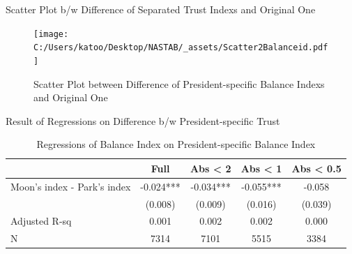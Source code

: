 \documentclass[
  ignorenonframetext,
]{beamer}
\begin{document}
\begin{frame}{Scatter Plot b/w Difference of Separated Trust Indexs and Original One}
\protect\hypertarget{scatter-plot-bw-difference-of-separated-trust-indexs-and-original-one-1}{}
\begin{figure}
\centering
\texttt{[image: C:/Users/katoo/Desktop/NASTAB/\_assets/Scatter2Balanceid.pdf]}
\caption{\label{fig:unnamed-chunk-12}Scatter Plot between Difference of President-specific Balance Indexs and Original One}
\end{figure}
\end{frame}

\begin{frame}{Result of Regressions on Difference b/w President-specific Trust}
\protect\hypertarget{result-of-regressions-on-difference-bw-president-specific-trust-1}{}
\begin{table}

\caption{\label{tab:kableRegTrustidOnDiff2Balanceid}Regressions of Balance Index on President-specific Balance Index}
\centering
\fontsize{9}{11}\selectfont
\begin{tabular}[t]{lcccc}
\toprule
 & Full & Abs < 2 & Abs < 1 & Abs < 0.5\\
\midrule
Moon's index - Park's index & -0.024*** & -0.034*** & -0.055*** & -0.058\\
 & (0.008) & (0.009) & (0.016) & (0.039)\\
Adjusted R-sq & 0.001 & 0.002 & 0.002 & 0.000\\
N & 7314 & 7101 & 5515 & 3384\\
\bottomrule
\end{tabular}
\end{table}
\end{frame}
\end{document}
